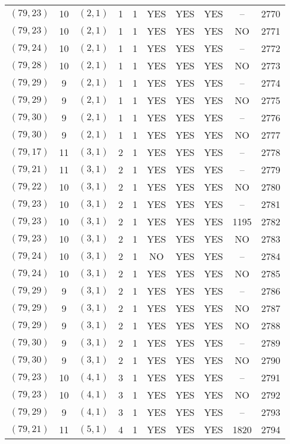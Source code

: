 \begin{longtable}{|c|c|c|c|c|c|c|c|c|c|}
$(79, 23)$ & 10 & $(2, 1)$ & 1 & 1 & YES & YES & YES & -- & 2770\\
$(79, 23)$ & 10 & $(2, 1)$ & 1 & 1 & YES & YES & YES & NO & 2771\\
$(79, 24)$ & 10 & $(2, 1)$ & 1 & 1 & YES & YES & YES & -- & 2772\\
$(79, 28)$ & 10 & $(2, 1)$ & 1 & 1 & YES & YES & YES & NO & 2773\\
$(79, 29)$ & 9 & $(2, 1)$ & 1 & 1 & YES & YES & YES & -- & 2774\\
$(79, 29)$ & 9 & $(2, 1)$ & 1 & 1 & YES & YES & YES & NO & 2775\\
$(79, 30)$ & 9 & $(2, 1)$ & 1 & 1 & YES & YES & YES & -- & 2776\\
$(79, 30)$ & 9 & $(2, 1)$ & 1 & 1 & YES & YES & YES & NO & 2777\\
$(79, 17)$ & 11 & $(3, 1)$ & 2 & 1 & YES & YES & YES & -- & 2778\\
$(79, 21)$ & 11 & $(3, 1)$ & 2 & 1 & YES & YES & YES & -- & 2779\\
$(79, 22)$ & 10 & $(3, 1)$ & 2 & 1 & YES & YES & YES & NO & 2780\\
$(79, 23)$ & 10 & $(3, 1)$ & 2 & 1 & YES & YES & YES & -- & 2781\\
$(79, 23)$ & 10 & $(3, 1)$ & 2 & 1 & YES & YES & YES & 1195 & 2782\\
$(79, 23)$ & 10 & $(3, 1)$ & 2 & 1 & YES & YES & YES & NO & 2783\\
$(79, 24)$ & 10 & $(3, 1)$ & 2 & 1 & NO & YES & YES & -- & 2784\\
$(79, 24)$ & 10 & $(3, 1)$ & 2 & 1 & YES & YES & YES & NO & 2785\\
$(79, 29)$ & 9 & $(3, 1)$ & 2 & 1 & YES & YES & YES & -- & 2786\\
$(79, 29)$ & 9 & $(3, 1)$ & 2 & 1 & YES & YES & YES & NO & 2787\\
$(79, 29)$ & 9 & $(3, 1)$ & 2 & 1 & YES & YES & YES & NO & 2788\\
$(79, 30)$ & 9 & $(3, 1)$ & 2 & 1 & YES & YES & YES & -- & 2789\\
$(79, 30)$ & 9 & $(3, 1)$ & 2 & 1 & YES & YES & YES & NO & 2790\\
$(79, 23)$ & 10 & $(4, 1)$ & 3 & 1 & YES & YES & YES & -- & 2791\\
$(79, 23)$ & 10 & $(4, 1)$ & 3 & 1 & YES & YES & YES & NO & 2792\\
$(79, 29)$ & 9 & $(4, 1)$ & 3 & 1 & YES & YES & YES & -- & 2793\\
$(79, 21)$ & 11 & $(5, 1)$ & 4 & 1 & YES & YES & YES & 1820 & 2794\\

\end{longtable}
